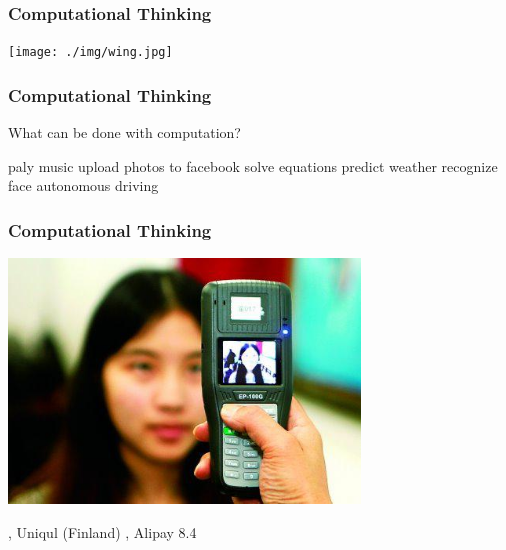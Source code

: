\documentclass[11pt]{beamer}
\begin{document}
\begin{frame}
	\frametitle{Computational Thinking}
	\Enlarge
	
	\texttt{[image: ./img/wing.jpg]}
\end{frame}


\begin{frame}
	\frametitle{Computational Thinking}
	\Enlarge
	\begin{itemize}
		\myitem What can be done with computation? \pause
		\begin{itemize}
	  		\mysubitem paly music \pause
			\mysubitem upload photos to facebook \pause
			\mysubitem solve equations \pause
			\mysubitem predict weather \pause
            \mysubitem recognize face \pause
			\mysubitem autonomous driving
		\end{itemize}
	\end{itemize}
\end{frame}



\begin{frame}
	\frametitle{Computational Thinking}
	\Enlarge
	\hspace{5mm} \includegraphics[width=0.7\textwidth]{./img/facepay.jpg}\\ \pause
	\begin{itemize}
	  		, Uniqul (Finland)
			, Alipay 8.4
	\end{itemize}
\end{frame}
\end{document}
